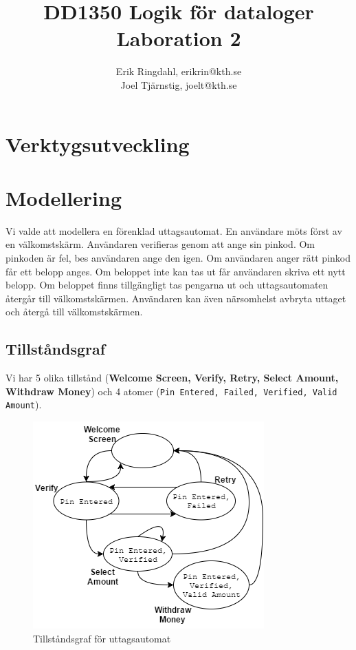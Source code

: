 \documentclass[]{article}
\title{DD1350 Logik för dataloger \\ Laboration 2}
\author{Erik Ringdahl, erikrin@kth.se \\ Joel Tjärnstig, joelt@kth.se}
\begin{document}
\setlength\parindent{0pt}
\maketitle

\section{Verktygsutveckling}

\clearpage
\section{Modellering}
Vi valde att modellera en förenklad uttagsautomat. En användare möts först av en välkomstskärm. Användaren verifieras genom att ange sin pinkod. Om pinkoden är fel, bes användaren ange den igen. Om användaren anger rätt pinkod får ett belopp anges. Om beloppet inte kan tas ut får användaren skriva ett nytt belopp. Om beloppet finns tillgängligt tas pengarna ut och uttagsautomaten återgår till välkomstskärmen. Användaren kan även närsomhelst avbryta uttaget och återgå till välkomstskärmen.

\subsection{Tillståndsgraf}
Vi har 5 olika tillstånd (\textbf{Welcome Screen, Verify, Retry, Select Amount, Withdraw Money}) och 4 atomer (\texttt{Pin Entered, Failed, Verified, Valid Amount}).

\begin{figure}[h]
\centering
\includegraphics[width=0.75\linewidth]{modell}
\caption{Tillståndsgraf för uttagsautomat}
\label{fig:modell}
\end{figure}
\end{document}
